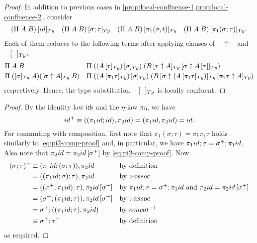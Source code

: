 \documentclass[a4paper,UKenglish,numberwithinsect,cleveref,thm-restate]{lipics-v2021}
\begin{document}
\propConfluenceThree*
\begin{proof}
  In addition to previous cases in \cref{prop:local-confluence-1,prop:local-confluence-2}, consider
  \begin{align*}
    \subTy{(\Pi\;A\;B)}{\idS} && \subTy{(\Pi\;A\;B)}{\sigma;\tau} && \subTy{(\Pi\;A\;B)}{\pi_1(\sigma, t)} && \subTy{(\Pi\;A\;B)}{\pi_1(\sigma; \tau)}.
  \end{align*}
  Each of them reduces to the following terms after applying clauses of $\mathord{\hspace{1pt}\text{--}\hspace{1pt}}\uparrow\mathord{\hspace{1pt}\text{--}\hspace{1pt}}$ and $\subTy{\blank}{\blank}$:
  \begin{align*}
    & \Pi\;A\;B                && \Pi\;(\subTy{(\subTy{A}{\tau})}{\sigma})\;(\subTy{\subTy{B}{\tau \uparrow A}}{\sigma \uparrow \sub{A}{\tau}}) \\
    & \Pi\;([\sigma]_{\Ty}\;A)([\sigma \uparrow A]_{\Ty}\;B) && \Pi\;(\subTy{(\subTy{A}{\pi_1\tau})}{\sigma})\;(\subTy{\subTy{B}{\sigma \uparrow (\subTy{A}{\pi_1\tau})}}{\pi_1 \tau \uparrow A})
  \end{align*}
  respectively.
  Hence, the type substitution $\subTy{\blank}{\blank}$ is locally confluent.
\end{proof}

\lemIdentities*
\begin{proof}
  By the identity law $\mathsf{idr}$ and the $\eta$-law $\pi\eta$, we have
  \[
    \idS^+ \judgeq ((\pi_1\idS; \idS), \pi_2 \idS) = (\pi_1\idS, \pi_2 \idS) = \idS.
  \]
  For commuting with composition, first note that $\pi_1(\sigma; \tau) = \sigma; \pi_1 \tau$ holds similarly to \eqref{eq:pi2-comp-proof} and, in particular, we have $\pi_1 \idS ; \sigma = \sigma^+; \pi_1\idS$.
  Also note that $\pi_2\idS = \sub{\pi_2\idS}{\sigma^+}$ by \eqref{eq:pi2-comp-proof}.
  Now
  \begin{align*}
    (\sigma; \tau)^+ & \judgeq (\pi_1\idS; (\sigma; \tau)), \pi_2 \idS && \text{by definition} \\
                     & = ((\pi_1\idS; \sigma); \tau), \pi_2 \idS       && \text{by ;-$\mathsf{assoc}$}\\
                     & = ((\sigma^+; \pi_1\idS); \tau), \sub{\pi_2 \idS}{\sigma^+} && \text{by $\pi_1\idS; \sigma = \sigma^+ ; \pi_1\idS$ and $\pi_2\idS = \sub{\pi_2\idS}{\sigma^+}$}\\
                     & = (\sigma^+; (\pi_1\idS; \tau)) , \sub{\pi_2\idS}{\sigma^+}  && \text{by ;-$\mathsf{assoc}$} \\
                     & = \sigma^+; ((\pi_1\idS ; \tau) , \pi_2\idS) && \text{by $\mathsf{concat}^{-1}$} \\
                     & \judgeq \sigma^+; \tau^+ && \text{by definition}
  \end{align*}
  as required.
\end{proof}
\end{document}
